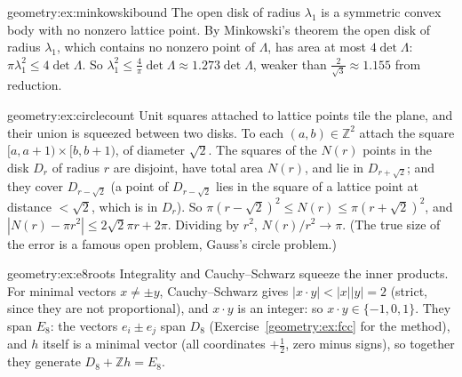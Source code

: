 \begin{solution}{geometry:ex:minkowskibound}
\idea The open disk of radius $\lambda_1$ is a symmetric convex body with no nonzero lattice point.
\writeup By Minkowski's theorem the open disk of radius $\lambda_1$, which contains no nonzero point of $\Lambda$, has area at most $4\det\Lambda$:
$\pi\lambda_1^2\le4\det\Lambda$. So
$\lambda_1^2\le\frac4\pi\det\Lambda\approx1.273\det\Lambda$, weaker than $\frac2{\sqrt3}\approx1.155$ from reduction.
\end{solution}

\begin{solution}{geometry:ex:circlecount}
\idea Unit squares attached to lattice points tile the plane, and their union is squeezed between two disks.
\writeup To each $(a,b)\in\mathbb Z^2$ attach the square $[a,a+1)\times[b,b+1)$, of diameter $\sqrt2$. The squares of the $N(r)$ points in the disk $D_r$ of radius $r$ are
disjoint, have total area $N(r)$, and lie in $D_{r+\sqrt2}$; and they cover $D_{r-\sqrt2}$ (a point of $D_{r-\sqrt2}$ lies in the square of a lattice point at distance
$<\sqrt2$, which is in $D_r$). So $\pi(r-\sqrt2)^2\le N(r)\le\pi(r+\sqrt2)^2$, and $|N(r)-\pi r^2|\le2\sqrt2\pi r+2\pi$. Dividing by $r^2$, $N(r)/r^2\to\pi$. (The true size of the error is a famous open
problem, Gauss's circle problem.)
\end{solution}

\begin{solution}{geometry:ex:e8roots}
\idea Integrality and Cauchy--Schwarz squeeze the inner products.
\writeup For minimal vectors $x\ne\pm y$, Cauchy--Schwarz gives $|x\cdot y|<|x||y|=2$ (strict, since they are not proportional), and $x\cdot y$ is an integer: so
$x\cdot y\in\{-1,0,1\}$. They span $E_8$: the vectors $e_i\pm e_j$ span $D_8$ (Exercise~\ref{geometry:ex:fcc} for the method), and $h$ itself is a minimal vector (all
coordinates $+\frac12$, zero minus signs), so together they generate $D_8+\mathbb Zh=E_8$.
\end{solution}

